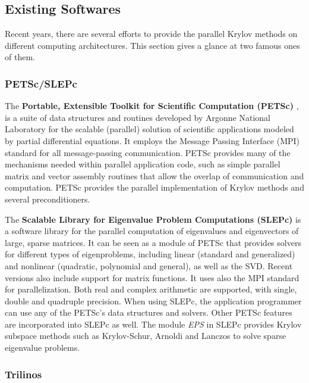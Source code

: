 \subsection{Existing Softwares}

Recent years, there are several efforts to provide the parallel Krylov methods on different computing architectures. This section gives a glance at two famous ones of them.

\subsubsection{PETSc/SLEPc} 

The \textbf{Portable, Extensible Toolkit for Scientific Computation (PETSc)} \cite{balay2001petsc}, is a suite of data structures and routines developed by Argonne National Laboratory for the scalable (parallel) solution of scientific applications modeled by partial differential equations. It employs the Message Passing Interface (MPI) standard for all message-passing communication. PETSc provides many of the mechanisms needed within parallel application code, such as simple parallel matrix and vector assembly routines that allow the overlap of communication and computation. PETSc provides the parallel implementation of Krylov methods and several preconditioners.

The \textbf{Scalable Library for Eigenvalue Problem Computations (SLEPc)} \cite{hernandez2005slepc} is a software library for the parallel computation of eigenvalues and eigenvectors of large, sparse matrices. It can be seen as a module of PETSc that provides solvers for different types of eigenproblems, including linear (standard and generalized) and nonlinear (quadratic, polynomial and general), as well as the SVD. Recent versions also include support for matrix functions. It uses also the MPI standard for parallelization. Both real and complex arithmetic are supported, with single, double and quadruple precision. When using SLEPc, the application programmer can use any of the PETSc's data structures and solvers. Other PETSc features are incorporated into SLEPc as well. The module \textit{EPS} in SLEPc provides Krylov subspace methods such as Krylov-Schur, Arnoldi and Lanczos to solve sparse eigenvalue problems.

\subsubsection{Trilinos} 

